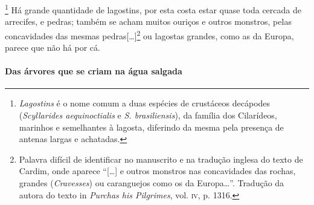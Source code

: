 \footnote{ \textit{Lagostins} é o nome comum a
duas espécies de crustáceos decápodes (\textit{Scyllarides
aequinoctialis} e \textit{S. brasiliensis}), da família dos Cilarídeos,
marinhos e semelhantes à lagosta, diferindo da mesma pela presença de
antenas largas e achatadas.} Há grande quantidade de
lagostins, por esta costa estar quase toda cercada de arrecifes, e
pedras; também se acham muitos ouriços e outros monstros, pelas
concavidades das mesmas pedras[\ldots]\footnote{ Palavra difícil de
identificar no manuscrito e na tradução inglesa do texto de Cardim,
onde aparece ``[\ldots] e outros monstros nas concavidades das rochas,
grandes (\textit{Cravesses}) ou caranguejos como os da Europa\ldots''.
Tradução da autora do texto in \textit{Purchas his Pilgrimes}, vol. \textsc{iv},
p. 1316.} ou lagostas grandes, como as da Europa, parece que não há por cá.


\paragraph{Das árvores que se criam na água salgada}


